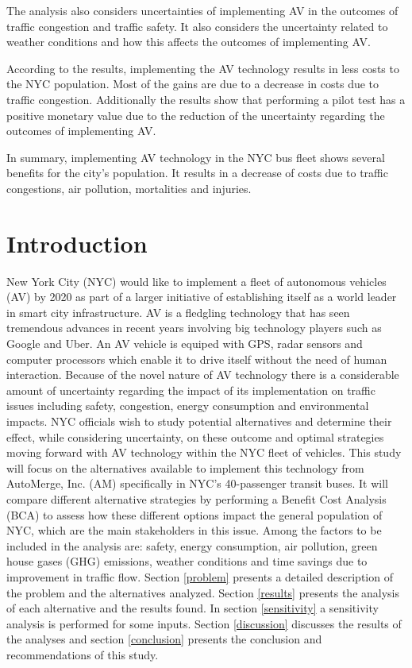 \documentclass[11pt, letterpaper]{article}
\begin{document}
The analysis also considers uncertainties of implementing AV in the outcomes of traffic congestion and
traffic safety. It also considers the uncertainty related to weather conditions and how this affects the outcomes
of implementing AV.

According to the results, implementing the AV technology results in less costs to the NYC population.
Most of the gains are due to a decrease in costs due to traffic congestion. Additionally the results show that 
performing a pilot test has a positive monetary value due to the reduction of the uncertainty regarding the 
outcomes of implementing AV.

In summary, implementing AV technology in the NYC bus fleet shows several benefits for the city's population. It results
in a decrease of costs due to traffic congestions, air pollution, mortalities and injuries.


\pagebreak
\section{Introduction} \label{intro}

New York City (NYC) would like to implement a fleet of autonomous
vehicles (AV) by 2020 as part of a larger initiative of establishing
itself as a world leader in smart city infrastructure. AV is a fledgling technology
that has seen tremendous advances in recent years involving
big technology players such as Google and Uber. An AV vehicle is equiped with
GPS, radar sensors and computer processors which enable it to drive itself without the
need of human interaction. Because of the
novel nature of AV technology there is a considerable amount of
uncertainty regarding the impact of its implementation on traffic
issues including safety, congestion, energy consumption and environmental impacts.
NYC officials wish to study potential alternatives and determine their effect, while
considering uncertainty, on these outcome
and optimal strategies moving forward with AV
technology within the NYC fleet of vehicles. This study will focus on
the alternatives available to implement  this technology
from AutoMerge, Inc. (AM) specifically in NYC's 40-passenger transit
buses. It will compare different alternative strategies by performing
a Benefit Cost Analysis (BCA) to assess how these different options
impact the general population of NYC, which are the main stakeholders
in this issue. Among the factors to be included in the analysis are:
safety, energy consumption, air pollution, green house gases (GHG) emissions, weather
conditions and time savings due to improvement in traffic flow. Section \ref{problem}
presents a detailed description of the problem and the alternatives analyzed. Section
\ref{results} presents the analysis of each alternative and the
results found. In section \ref{sensitivity} a sensitivity analysis is
performed for some inputs. Section \ref{discussion} discusses the
results of the analyses and section \ref{conclusion} presents the
conclusion and recommendations of this study.
\end{document}
